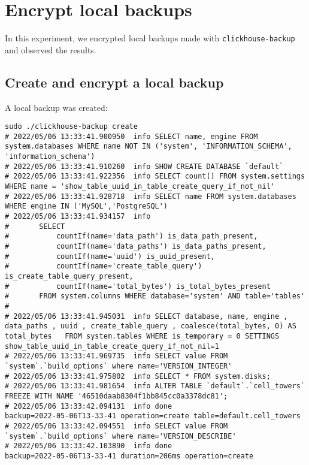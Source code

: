 \section{Encrypt local backups}
\label{app:chs2e1}
In this experiment, we encrypted local backups made with \texttt{clickhouse-backup}
and observed the results.

\subsection{Create and encrypt a local backup}
\label{sec:orgccc578b}
A local backup was created:
\begin{verbatim}
sudo ./clickhouse-backup create
# 2022/05/06 13:33:41.900950  info SELECT name, engine FROM system.databases WHERE name NOT IN ('system', 'INFORMATION_SCHEMA', 'information_schema')
# 2022/05/06 13:33:41.910260  info SHOW CREATE DATABASE `default`
# 2022/05/06 13:33:41.922356  info SELECT count() FROM system.settings WHERE name = 'show_table_uuid_in_table_create_query_if_not_nil'
# 2022/05/06 13:33:41.928718  info SELECT name FROM system.databases WHERE engine IN ('MySQL','PostgreSQL')
# 2022/05/06 13:33:41.934157  info
# 		SELECT
# 			countIf(name='data_path') is_data_path_present,
# 			countIf(name='data_paths') is_data_paths_present,
# 			countIf(name='uuid') is_uuid_present,
# 			countIf(name='create_table_query') is_create_table_query_present,
# 			countIf(name='total_bytes') is_total_bytes_present
# 		FROM system.columns WHERE database='system' AND table='tables'
#
# 2022/05/06 13:33:41.945031  info SELECT database, name, engine , data_paths , uuid , create_table_query , coalesce(total_bytes, 0) AS total_bytes   FROM system.tables WHERE is_temporary = 0 SETTINGS show_table_uuid_in_table_create_query_if_not_nil=1
# 2022/05/06 13:33:41.969735  info SELECT value FROM `system`.`build_options` where name='VERSION_INTEGER'
# 2022/05/06 13:33:41.975802  info SELECT * FROM system.disks;
# 2022/05/06 13:33:41.981654  info ALTER TABLE `default`.`cell_towers` FREEZE WITH NAME '46510daab8304f1bb845cc0a3378dc81';
# 2022/05/06 13:33:42.094131  info done                      backup=2022-05-06T13-33-41 operation=create table=default.cell_towers
# 2022/05/06 13:33:42.094551  info SELECT value FROM `system`.`build_options` where name='VERSION_DESCRIBE'
# 2022/05/06 13:33:42.103890  info done                      backup=2022-05-06T13-33-41 duration=206ms operation=create
\end{verbatim}

